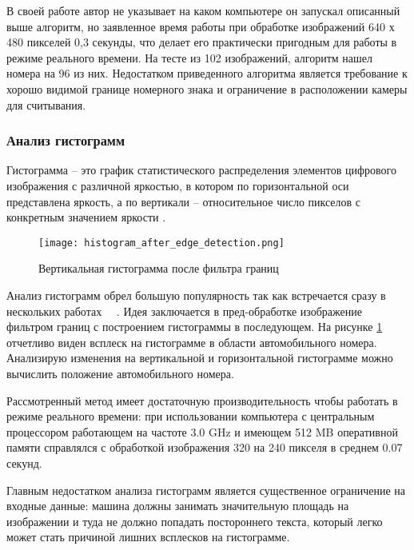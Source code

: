 В своей работе автор не указывает на каком компьютере он запускал описанный выше алгоритм, но заявленное время работы при обработке изображений 640 х 480 пикселей 0,3 секунды, что делает его практически пригодным для работы в режиме реального времени. На тесте из 102 изображений, алгоритм нашел номера на 96 из них. Недостатком приведенного алгоритма является требование к хорошо видимой границе номерного знака и ограничение в расположении камеры для считывания.

\subsubsection{Анализ гистограмм}
\label{sub:domain:search:histogram_analisys}

Гистограмма -- это график статистического распределения элементов цифрового изображения с различной яркостью, в котором по горизонтальной оси представлена яркость, а по вертикали -- относительное число пикселов с конкретным значением яркости \cite{color_histogram}.

\begin{figure}[ht]
\centering
    \texttt{[image: histogram\_after\_edge\_detection.png]}  
    \caption{Вертикальная гистограмма после фильтра границ}
    \label{fig:domain:search:edges_analisys:vertical_histogram_after_edge_detection}
\end{figure}

Анализ гистограмм обрел большую популярность так как встречается сразу в нескольких работах ~\cite{recognition_using_histogram_1}~\cite{recognition_using_histogram_2}. 
Идея заключается в пред-обработке изображение фильтром границ с построением гистограммы в последующем. На рисунке \ref{fig:domain:search:edges_analisys:vertical_histogram_after_edge_detection} отчетливо виден всплеск на гистограмме в области автомобильного номера. Анализирую изменения на вертикальной и горизонтальной гистограмме можно вычислить положение автомобильного номера. 

Рассмотренный метод имеет достаточную производительность чтобы работать в режиме реального времени: при использовании компьютера с центральным процессором работающем на частоте 3.0 GHz и имеющем 512 MB оперативной памяти справлялся с обработкой изображения 320 на 240 пикселя в среднем 0.07 секунд.

Главным недостатком анализа гистограмм является существенное ограничение на входные данные: машина должны занимать значительную площадь на изображении и туда не должно попадать постороннего текста, который легко может стать причиной лишних всплесков на гистограмме.

